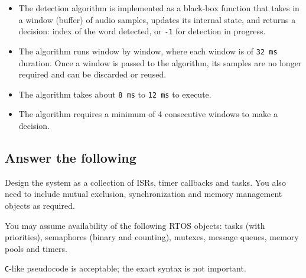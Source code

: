 \begin{itemize}[topsep=0pt]
      \item The detection algorithm is implemented as a black-box function that takes in a window (buffer) of audio samples, updates its internal state, and returns a decision: index of the word detected, or \texttt{-1} for detection in progress.

      \item The algorithm runs window by window, where each window is of \texttt{32\,ms} duration.
            Once a window is passed to the algorithm, its samples are no longer required and can be discarded or reused.

      \item The algorithm takes about \texttt{8\,ms} to \texttt{12\,ms} to execute.

      \item The algorithm requires a minimum of 4 consecutive windows to make a decision.
\end{itemize}

\vspace*{-1.5em}
\subsection*{Answer the following}
\vspace*{-0.5em}

Design the system as a collection of ISRs, timer callbacks and tasks.
You also need to include mutual exclusion, synchronization and memory management objects as required.

You may assume availability of the following RTOS objects: tasks (with priorities), semaphores (binary and counting), mutexes, message queues, memory pools and timers.

\texttt{C}-like pseudocode is acceptable; the exact syntax is not important.
